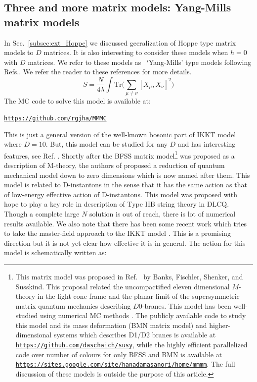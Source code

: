 \documentclass[11pt]{article}
\begin{document}
\subsection{Three and more matrix models: Yang-Mills matrix models}
In Sec.~\ref{subsec:ext_Hoppe} we discussed geeralization of Hoppe type matrix models to $D$ matrices. 
It is also interesting to consider these models when $h=0$ with $D$ matrices. We refer to these models 
as ~`Yang-Mills' type models following Refs.\cite{Krauth:1998yu,Krauth:1999qw}. We refer the reader to these
references for more details. 
\begin{equation}
	\label{eq:CTmodel} 
S = \frac{N}{4\lambda} \int \mbox{Tr} \Bigg( \sum_{\mu \neq \nu}[X_\mu, X_\nu]^{2}\Bigg) 
\end{equation}
The MC code to solve this model is
available at:
\begin{center} \texttt{\href{https://github.com/rgjha/MMMC}{https://github.com/rgjha/MMMC}} \end{center}
This is just a general version of the well-known bosonic part of IKKT model
where $D=10$. But, this model can be studied for any $D$ and has 
interesting features, see Ref. \cite{Hotta:1998en}. 
Shortly after the BFSS matrix model\footnote{This matrix model was proposed in Ref.~\cite{Banks:1996vh} by
Banks, Fischler, Shenker, and Susskind. This proposal related the 
uncompactified eleven dimensional $M$-theory in the light cone frame and the 
planar limit of the supersymmetric matrix quantum mechanics describing $D0$-branes. This model has been
well-studied using numerical MC methods \cite{}. The publicly available code to study this model and its
mass deformation (BMN matrix model) and higher-dimensional systems which describes D1/D2 branes 
\cite{Catterall:2017lub,Jha:2017zad,Catterall:2020nmn}
is available at \texttt{\href{https://github.com/daschaich/susy}{https://github.com/daschaich/susy}}, while the
highly efficient parallelized code over number of colours for only BFSS and BMN is available at
\texttt{\href{https://sites.google.com/site/hanadamasanori/home/mmmm}{https://sites.google.com/site/hanadamasanori/home/mmmm}}. The full discussion of these models is outside the purpose of this article. 
}
was proposed as a description of M-theory, the authors of 
\cite{Ishibashi:1996xs} proposed a reduction of quantum mechanical model down to zero 
dimensions which is now named after them. This model is related to D-instantons 
in the sense that it has the same action as that of low-energy effective action of D-instantons. 
This model was proposed with hope to play a key role in description of Type IIB string theory in DLCQ. 
Though a complete large $N$ solution is out of reach, there is lot of numerical results available. 
We also note that there has been some recent work which tries to take the master-field approach to the
IKKT model \cite{Klinkhamer:2021wrv}. This is a promising direction but it is not yet clear how effective it is in general.
The action for this model is schematically written as:
\end{document}
